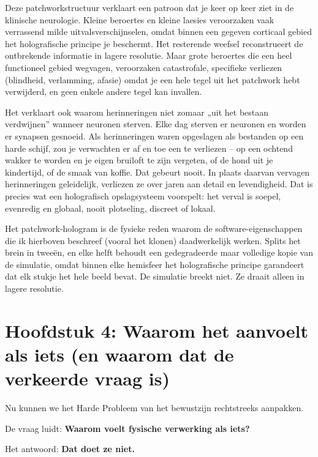 \documentclass[11pt, twoside, openright]{book}
\begin{document}
Deze patchworkstructuur verklaart een patroon dat je keer op keer ziet in de klinische neurologie. Kleine beroertes en kleine laesies veroorzaken vaak verrassend milde uitvalsverschijnselen, omdat binnen een gegeven corticaal gebied het holografische principe je beschermt. Het resterende weefsel reconstrueert de ontbrekende informatie in lagere resolutie. Maar grote beroertes die een heel functioneel gebied wegvagen, veroorzaken catastrofale, specifieke verliezen (blindheid, verlamming, afasie) omdat je een hele tegel uit het patchwork hebt verwijderd, en geen enkele andere tegel kan invallen.

Het verklaart ook waarom herinneringen niet zomaar „uit het bestaan verdwijnen” wanneer neuronen sterven. Elke dag sterven er neuronen en worden er synapsen gesnoeid. Als herinneringen waren opgeslagen als bestanden op een harde schijf, zou je verwachten er af en toe een te verliezen -- op een ochtend wakker te worden en je eigen bruiloft te zijn vergeten, of de hond uit je kindertijd, of de smaak van koffie. Dat gebeurt nooit. In plaats daarvan vervagen herinneringen geleidelijk, verliezen ze over jaren aan detail en levendigheid. Dat is precies wat een holografisch opslagsysteem voorspelt: het verval is soepel, evenredig en globaal, nooit plotseling, discreet of lokaal.

Het patchwork-hologram is de fysieke reden waarom de software-eigenschappen die ik hierboven beschreef (vooral het klonen) daadwerkelijk werken. Splits het brein in tweeën, en elke helft behoudt een gedegradeerde maar volledige kopie van de simulatie, omdat binnen elke hemisfeer het holografische principe garandeert dat elk stukje het hele beeld bevat. De simulatie breekt niet. Ze draait alleen in lagere resolutie.


\chapter*{Hoofdstuk 4: Waarom het aanvoelt als iets (en waarom dat de verkeerde vraag is)}

Nu kunnen we het Harde Probleem van het bewustzijn rechtstreeks aanpakken.

De vraag luidt: \textbf{Waarom voelt fysische verwerking als iets?}

Het antwoord: \textbf{Dat doet ze niet.}
\end{document}
